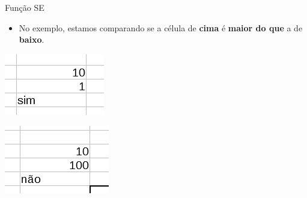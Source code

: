 \begin{frame}{Função SE}
	\begin{block}{}
		\begin{itemize}
			\item No exemplo, estamos comparando se a célula de \textbf{cima} é \textbf{maior do que} a de \textbf{baixo}.
		\end{itemize}
	\end{block}

	\begin{minipage}{0.45\linewidth}
		\centering
		\includegraphics[width=1\linewidth]{Figuras/Ch06/fig47}
	\end{minipage}\hfill
	\begin{minipage}{0.45\linewidth}
		\centering
		\includegraphics[width=1\linewidth]{Figuras/Ch06/fig48}
	\end{minipage}
\end{frame}


